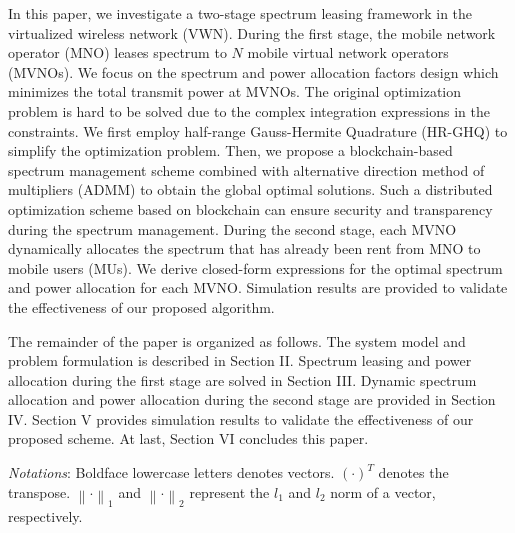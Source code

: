 \documentclass[journal]{IEEEtran}
\begin{document}
In this paper, we investigate a two-stage spectrum leasing framework in the virtualized wireless network (VWN). During the first stage, the mobile network operator (MNO) leases spectrum to $N$ mobile virtual network operators (MVNOs). We focus on the spectrum and power allocation factors design which minimizes the total transmit power at MVNOs. The original optimization problem is hard to be solved due to the complex integration expressions in the constraints. We first employ half-range Gauss-Hermite Quadrature (HR-GHQ) to simplify the optimization problem. Then, we propose a blockchain-based spectrum management scheme combined with alternative direction method of multipliers (ADMM) to obtain the global optimal solutions. Such a distributed optimization scheme based on blockchain can ensure security and transparency during the spectrum management. During the second stage, each MVNO dynamically allocates the spectrum that has already been rent from MNO to mobile users (MUs). We derive closed-form expressions for the optimal spectrum and power allocation for each MVNO. Simulation results are provided to validate the effectiveness of our proposed algorithm.

The remainder of the paper is organized as follows. The system model and problem formulation is described in Section II. Spectrum leasing and power allocation during the first stage are solved in Section III. Dynamic spectrum allocation and power allocation during the second stage are provided in Section IV. Section V provides simulation results to validate the effectiveness of our proposed scheme. At last, Section VI concludes this paper.

\emph{Notations}: Boldface lowercase letters denotes vectors. $\left(\cdot\right)^T$ denotes the transpose. $\left\|\cdot \right\|_1$ and $\left\|\cdot \right\|_2$ represent the $l_1$ and $l_2$ norm of a vector, respectively.
\end{document}
